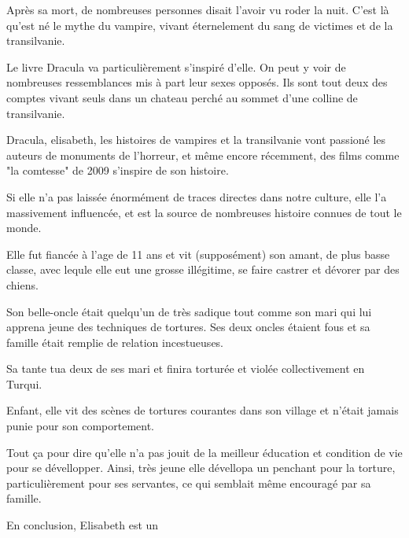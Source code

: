 \documentclass[a4paper, 12pt]{article}
\begin{document}
    Après sa mort, de nombreuses personnes disait l'avoir vu roder la nuit.
    C'est là qu'est né le mythe du vampire, vivant éternelement du sang de
    victimes et de la transilvanie.

    Le livre Dracula va particulièrement s'inspiré d'elle. On peut y voir de
    nombreuses ressemblances mis à part leur sexes opposés. Ils sont tout deux 
    des comptes vivant seuls dans un chateau perché au sommet d'une colline de
    transilvanie.

    Dracula, elisabeth, les histoires de vampires et la transilvanie vont 
    passioné les auteurs de monuments de l'horreur, et même encore récemment,
    des films comme "la comtesse" de 2009 s'inspire de son histoire.

    Si elle n'a pas laissée énormément de traces directes dans notre culture,
    elle l'a massivement influencée, et est la source de nombreuses histoire
    connues de tout le monde.

    Elle fut fiancée à l'age de 11 ans et vit (supposément) son amant, de plus
    basse classe, avec lequle elle eut une grosse illégitime, se faire castrer
    et dévorer par des chiens.

    Son belle-oncle était quelqu'un de très sadique tout comme son mari qui lui 
    apprena jeune des techniques de tortures. Ses deux oncles étaient fous et
    sa famille était remplie de relation incestueuses.

    Sa tante tua deux de ses mari et finira torturée et violée collectivement en
    Turqui.

    Enfant, elle vit des scènes de tortures courantes dans son village et
    n'était jamais punie pour son comportement.

    Tout ça pour dire qu'elle n'a pas jouit de la meilleur éducation et
    condition de vie pour se dévellopper. Ainsi, très jeune elle dévellopa un
    penchant pour la torture, particulièrement pour ses servantes, ce qui
    semblait même encouragé par
    sa famille.


    En conclusion, Elisabeth est un 
\end{document}
